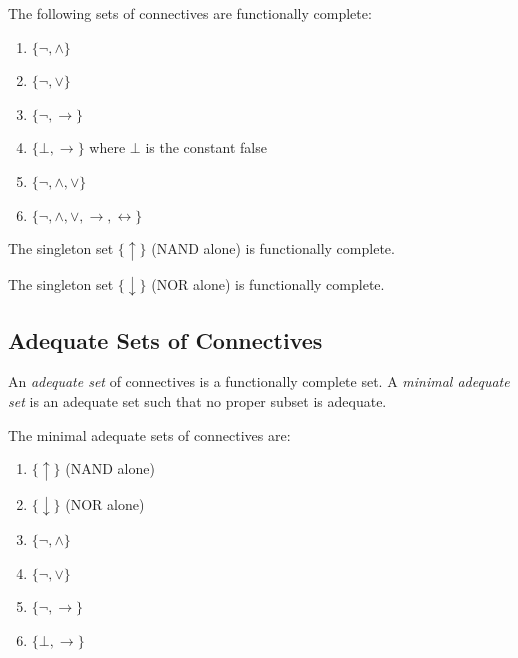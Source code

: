 \begin{theorem}
The following sets of connectives are functionally complete:
\begin{enumerate}
  \item $\{\neg, \wedge\}$
  \item $\{\neg, \vee\}$
  \item $\{\neg, \rightarrow\}$
  \item $\{\bot, \rightarrow\}$ where $\bot$ is the constant false
  \item $\{\neg, \wedge, \vee\}$
  \item $\{\neg, \wedge, \vee, \rightarrow, \leftrightarrow\}$
\end{enumerate}
\end{theorem}



\begin{theorem}
The singleton set $\{\uparrow\}$ (NAND alone) is functionally complete.
\end{theorem}



\begin{theorem}
The singleton set $\{\downarrow\}$ (NOR alone) is functionally complete.
\end{theorem}



\subsection{Adequate Sets of Connectives}

\begin{definition}
An \emph{adequate set} of connectives is a functionally complete set. A
\emph{minimal adequate set} is an adequate set such that no proper subset is
adequate.
\end{definition}

\begin{theorem}
The minimal adequate sets of connectives are:
\begin{enumerate}
  \item $\{\uparrow\}$ (NAND alone)
  \item $\{\downarrow\}$ (NOR alone)
  \item $\{\neg, \wedge\}$
  \item $\{\neg, \vee\}$
  \item $\{\neg, \rightarrow\}$
  \item $\{\bot, \rightarrow\}$
\end{enumerate}
\end{theorem}

